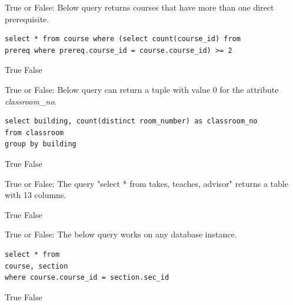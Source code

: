 \documentclass[12pt, addpoints, answers]{exam}
\begin{document}
\begin{questions}
\begin{minipage}{\linewidth}
\question[2]
True or False: Below query returns courses that have more than one direct prerequisite.\par\vspace{0.5em}
\begin{verbatim}
select * from course where (select count(course_id) from 
prereq where prereq.course_id = course.course_id) >= 2
\end{verbatim}
\begin{checkboxes}
    \CorrectChoice True
    \choice False
\end{checkboxes}
\end{minipage}\vspace{1em}

\begin{minipage}{\linewidth}
\question[2]
True or False: Below query can return a tuple with value 0 for the attribute \textit{classroom\_no}.\par\vspace{0.5em}
\begin{verbatim}
select building, count(distinct room_number) as classroom_no
from classroom
group by building
\end{verbatim}
\begin{checkboxes}
    \choice True
    \CorrectChoice False
\end{checkboxes}
\end{minipage}\vspace{1em}

\begin{minipage}{\linewidth}
\question[2]
True or False: The query "select * from takes, teaches, advisor" returns a table with 13 columns. \par\vspace{0.5em}
\begin{checkboxes}
    \CorrectChoice True
    \choice False
\end{checkboxes}
\end{minipage}\vspace{1em}

\begin{minipage}{\linewidth}
\question[2]
True or False: The below query works on any database instance.\par\vspace{0.5em}
\begin{verbatim}
select * from
course, section
where course.course_id = section.sec_id
\end{verbatim}
\begin{checkboxes}
    \CorrectChoice True
    \choice False
\end{checkboxes}
\end{minipage}\vspace{1em}



\end{questions}
\end{document}
